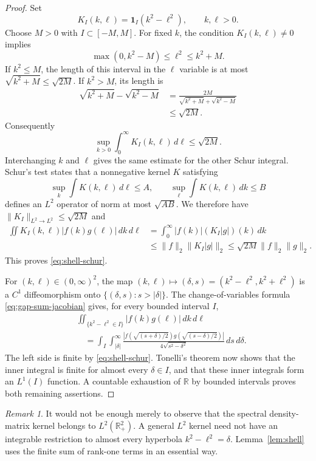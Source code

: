 \documentclass[11pt]{amsart}
\numberwithin{equation}{section}
\theoremstyle{remark}
\newtheorem{remark}[theorem]{Remark}
\newcommand{\R}{\mathbb R}
\begin{document}
\begin{proof}
Set
\[
 K_I(k,\ell)=\mathbf 1_I(k^2-\ell^2),
 \qquad k,\ell>0.
\]
Choose $M>0$ with $I\subset[-M,M]$.  For fixed $k$, the condition
$K_I(k,\ell)\ne0$ implies
\[
 \max(0,k^2-M)\le \ell^2\le k^2+M.
\]
If $k^2\le M$, the length of this interval in the $\ell$ variable is at most
$\sqrt{k^2+M}\le\sqrt{2M}$.  If $k^2>M$, its length is
\begin{align*}
 \sqrt{k^2+M}-\sqrt{k^2-M}
 &=\frac{2M}{\sqrt{k^2+M}+\sqrt{k^2-M}}\\
 &\le \sqrt{2M}.
\end{align*}
Consequently
\[
 \sup_{k>0}\int_0^\infty K_I(k,\ell)\,d\ell\le\sqrt{2M}.
\]
Interchanging $k$ and $\ell$ gives the same estimate for the other Schur
integral.  Schur's test states that a nonnegative kernel $K$ satisfying
\[
 \sup_k\int K(k,\ell)\,d\ell\le A,
 \qquad
 \sup_\ell\int K(k,\ell)\,dk\le B
\]
defines an $L^2$ operator of norm at most $\sqrt{AB}$.  We therefore have
$\|K_I\|_{L^2\to L^2}\le\sqrt{2M}$ and
\begin{align*}
 \iint K_I(k,\ell)|f(k)g(\ell)|\,dk\,d\ell
 &=\int_0^\infty |f(k)|(K_I|g|)(k)\,dk\\
 &\le\|f\|_2\|K_I|g|\|_2
 \le\sqrt{2M}\|f\|_2\|g\|_2.
\end{align*}
This proves \eqref{eq:shell-schur}.

For $(k,\ell)\in(0,\infty)^2$, the map
$(k,\ell)\mapsto(\delta,s)=(k^2-\ell^2,k^2+\ell^2)$ is a $C^1$
diffeomorphism onto $\{(\delta,s):s>|\delta|\}$.  The change-of-variables
formula \eqref{eq:gap-sum-jacobian} gives, for every bounded interval $I$,
\begin{align*}
 &\iint_{\{k^2-\ell^2\in I\}}|f(k)g(\ell)|\,dk\,d\ell\\
 &\quad=\int_I\int_{|\delta|}^\infty
 \frac{|f(\sqrt{(s+\delta)/2})g(\sqrt{(s-\delta)/2})|}
 {4\sqrt{s^2-\delta^2}}\,ds\,d\delta.
\end{align*}
The left side is finite by \eqref{eq:shell-schur}.  Tonelli's theorem now
shows that the inner integral is finite for almost every $\delta\in I$, and
that these inner integrals form an $L^1(I)$ function.  A countable exhaustion
of $\R$ by bounded intervals proves both remaining assertions.
\end{proof}

\begin{remark}\label{rem:rank-one-essential}
It would not be enough merely to observe that the spectral density-matrix
kernel belongs to $L^2(\R_+^2)$.  A general $L^2$ kernel need not have an
integrable restriction to almost every hyperbola $k^2-\ell^2=\delta$.
Lemma~\ref{lem:shell} uses the finite sum of rank-one terms in an essential
way.
\end{remark}
\end{document}
